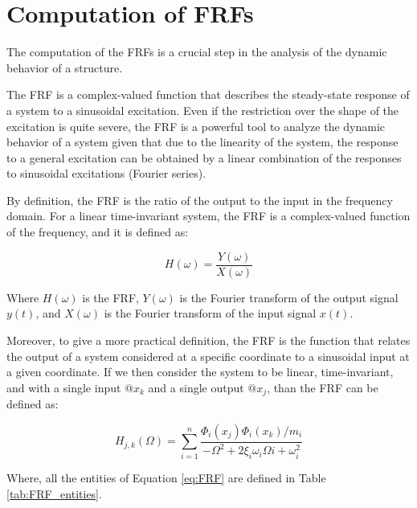 \section{Computation of FRFs}
\label{sec:computation_of_FRFs}

The computation of the FRFs is a crucial step in the analysis of the dynamic behavior of a structure.

The FRF is a complex-valued function that describes the steady-state response of a system to a sinusoidal excitation.
Even if the restriction over the shape of the excitation is quite severe, the FRF is a powerful tool to analyze the dynamic behavior of a system given that due to the linearity of the system, the response to a general excitation can be obtained by a linear combination of the responses to sinusoidal excitations (Fourier series).

By definition, the FRF is the ratio of the output to the input in the frequency domain.
For a linear time-invariant system, the FRF is a complex-valued function of the frequency, and it is defined as:

\begin{equation}
    H(\omega) = \frac{Y(\omega)}{X(\omega)}
\end{equation}

Where $H(\omega)$ is the FRF, $Y(\omega)$ is the Fourier transform of the output signal $y(t)$, and $X(\omega)$ is the Fourier transform of the input signal $x(t)$.

Moreover, to give a more practical definition, the FRF is the function that relates the output of a system considered at a specific coordinate to a sinusoidal input at a given coordinate.
If we then consider the system to be linear, time-invariant, and with a single input $@x_k$ and a single output $@x_j$, than the FRF can be defined as:

\begin{equation}
    H_{j,k}(\Omega) = \sum_{i=1}^{n} \frac{\Phi_i(x_j) \Phi_i(x_k) / m_i}{-\Omega^2 + 2\xi_i \omega_i \Omega i + \omega_i^2}
    \label{eq:FRF}
\end{equation}

Where, all the entities of Equation \ref{eq:FRF} are defined in Table \ref{tab:FRF_entities}.

